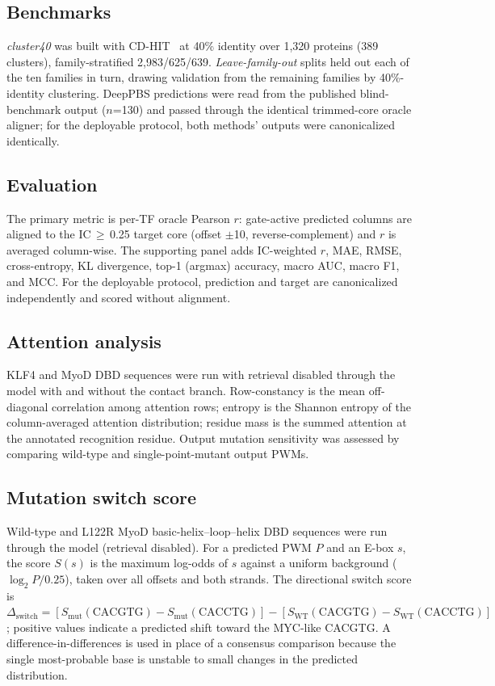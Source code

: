 \documentclass[11pt,letterpaper]{article}
\begin{document}
\subsection*{Benchmarks}
\textit{cluster40} was built with CD-HIT~\cite{LiGodzik2006} at 40\% identity over
1,320 proteins (389 clusters), family-stratified 2,983/625/639. \textit{Leave-family-out}
splits held out each of the ten families in turn, drawing validation from the
remaining families by 40\%-identity clustering. DeepPBS predictions were read from
the published blind-benchmark output ($n$=130) and passed through the identical
trimmed-core oracle aligner; for the deployable protocol, both methods' outputs were
canonicalized identically.

\subsection*{Evaluation}
The primary metric is per-TF oracle Pearson $r$: gate-active predicted columns are
aligned to the IC\,$\geq$\,0.25 target core (offset $\pm$10, reverse-complement) and
$r$ is averaged column-wise. The supporting panel adds IC-weighted $r$, MAE, RMSE,
cross-entropy, KL divergence, top-1 (argmax) accuracy, macro AUC, macro F1, and MCC.
For the deployable protocol, prediction and target are canonicalized independently
and scored without alignment.

\subsection*{Attention analysis}
KLF4 and MyoD DBD sequences were run with retrieval disabled through the model with
and without the contact branch. Row-constancy is the mean off-diagonal correlation
among attention rows; entropy is the Shannon entropy of the column-averaged
attention distribution; residue mass is the summed attention at the annotated
recognition residue. Output mutation sensitivity was assessed by comparing
wild-type and single-point-mutant output PWMs.

\subsection*{Mutation switch score}
Wild-type and L122R MyoD basic-helix--loop--helix DBD sequences were run through the
model (retrieval disabled). For a predicted PWM $P$ and an E-box $s$, the score $S(s)$
is the maximum log-odds of $s$ against a uniform background ($\log_2 P/0.25$), taken
over all offsets and both strands. The directional switch score is
$\Delta_{\text{switch}} = [S_{\text{mut}}(\text{CACGTG}) - S_{\text{mut}}(\text{CACCTG})]
- [S_{\text{WT}}(\text{CACGTG}) - S_{\text{WT}}(\text{CACCTG})]$; positive values indicate
a predicted shift toward the MYC-like CACGTG. A difference-in-differences is used in
place of a consensus comparison because the single most-probable base is unstable to
small changes in the predicted distribution.
\end{document}
